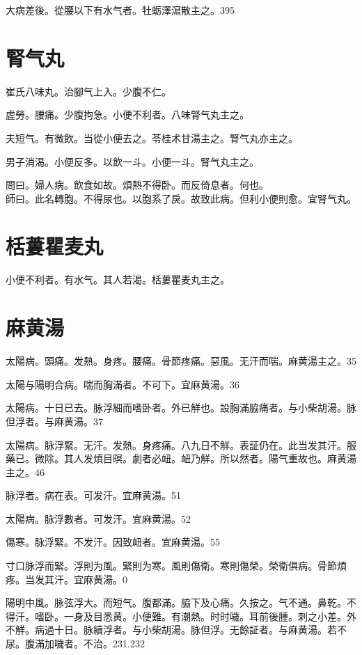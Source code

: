 \documentclass[12pt,twoside,UTF8,b5paper]{ctexbook}
\begin{document}
大病差後。從腰以下有水气者。牡蛎澤瀉散主之。395

\section{腎气丸}

崔氏八味丸。治腳气上入。少腹不仁。

虗勞。腰痛。少腹拘急。小便不利者。八味腎气丸主之。

夫短气。有微飲。当從小便去之。苓桂术甘湯主之。腎气丸亦主之。

男子消渴。小便反多。以飲一斗。小便一斗。腎气丸主之。

問曰。婦人病。飲食如故。煩熱不得卧。而反倚息者。何也。\\
師曰。此名轉胞。不得尿也。以胞系了戾。故致此病。但利小便則愈。宜腎气丸。

\section{栝蔞瞿麦丸}

小便不利者。有水气。其人若渴。栝蔞瞿麦丸主之。

\section{麻黄湯}

太陽病。頭痛。发熱。身疼。腰痛。骨節疼痛。惡風。无汗而喘。麻黄湯主之。35

太陽与陽明合病。喘而胸滿者。不可下。宜麻黄湯。36

太陽病。十日已去。脉浮細而嗜卧者。外已觧也。設胸滿脇痛者。与小柴胡湯。脉{但}浮者。与麻黄湯。37

太陽病。脉浮緊。无汗。发熱。身疼痛。八九日不觧。表証仍在。此当发其汗。服藥已。微除。其人发煩目暝。劇者必衄。衄乃觧。所以然者。陽气重故也。麻黄湯主之。46

脉浮者。病在表。可发汗。宜麻黄湯。51

{太陽病。}脉浮數者。可发汗。宜麻黄湯。52

傷寒。脉浮緊。不发汗。因致衄者。宜麻黄湯。55

{寸口}脉浮而緊。浮則为風。緊則为寒。風則傷衛。寒則傷榮。榮衛俱病。骨節煩疼。当发其汗。宜麻黄湯。0

陽明中風。脉弦浮大。而短气。腹都滿。脇下及心痛。久按之。气不通。鼻乾。不得汗。嗜卧。一身及目悉黄。小便難。有潮熱。时时噦。耳前後腫。刺之小差。外不觧。病過十日。脉續浮者。与{小}柴胡湯。脉但浮。无餘証者。与麻黄湯。若不尿。腹滿加噦者。不治。231.232
\end{document}
